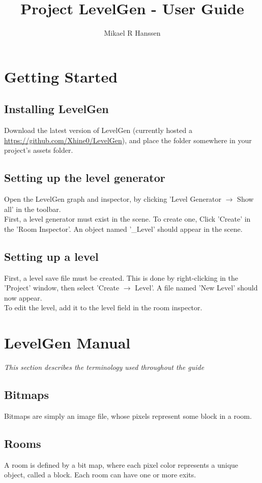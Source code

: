 \documentclass[a4paper]{article}
\begin{document}
	\title{Project LevelGen - User Guide}
	\author{Mikael R Hanssen}
	\maketitle
	
	\tableofcontents
	\newpage
	
	\section{Getting Started}
	\subsection{Installing LevelGen}
	Download the latest version of LevelGen (currently hosted a \url{https://github.com/Xhine0/LevelGen}), and place the folder somewhere in your project's assets folder.
	\subsection{Setting up the level generator}
	Open the LevelGen graph and inspector, by clicking 'Level Generator $\rightarrow$ Show all' in the toolbar. 
	\\First, a level generator must exist in the scene. To create one, Click 'Create' in the 'Room Inspector'. An object named '\_Level' should appear in the scene.
	\subsection{Setting up a level}
	First, a level save file must be created. This is done by right-clicking in the 'Project' window, then select 'Create $\rightarrow$ Level'. A file named 'New Level' should now appear. 
	\\ To edit the level, add it to the level field in the room inspector.
	
	\section{LevelGen Manual}
	\textit{This section describes the terminology used throughout the guide}
	\label{section_manual}
	\subsection{Bitmaps}
	\label{section_manual-bitmaps}
	Bitmaps are simply an image file, whose pixels represent some block in a room. 
	\subsection{Rooms}
	A room is defined by a bit map, where each pixel color represents a unique object, called a block. Each room can have one or more exits.
\end{document}
